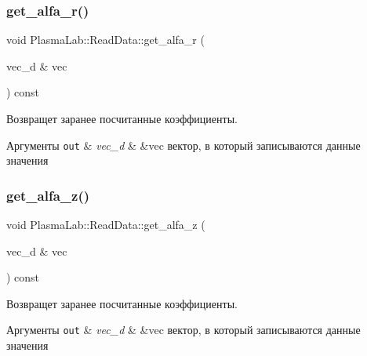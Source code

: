 \subsubsection{\texorpdfstring{get\+\_\+alfa\+\_\+r()}{get\_alfa\_r()}}
{\footnotesize\ttfamily void Plasma\+Lab\+::\+Read\+Data\+::get\+\_\+alfa\+\_\+r (\begin{DoxyParamCaption}\item[{vec\+\_\+d \&}]{vec }\end{DoxyParamCaption}) const\hspace{0.3cm}{\ttfamily [inline]}}

Возвращет заранее посчитанные коэффициенты. 
\begin{DoxyParams}[1]{Аргументы}
\mbox{\tt out}  & {\em vec\+\_\+d} & \&vec вектор, в который записываются данные значения \\
\hline
\end{DoxyParams}
\mbox{\label{class_plasma_lab_1_1_read_data_aba0b62c0133fdbc1d652f3937cc751d5}} 
\subsubsection{\texorpdfstring{get\+\_\+alfa\+\_\+z()}{get\_alfa\_z()}}
{\footnotesize\ttfamily void Plasma\+Lab\+::\+Read\+Data\+::get\+\_\+alfa\+\_\+z (\begin{DoxyParamCaption}\item[{vec\+\_\+d \&}]{vec }\end{DoxyParamCaption}) const\hspace{0.3cm}{\ttfamily [inline]}}

Возвращет заранее посчитанные коэффициенты. 
\begin{DoxyParams}[1]{Аргументы}
\mbox{\tt out}  & {\em vec\+\_\+d} & \&vec вектор, в который записываются данные значения \\
\hline
\end{DoxyParams}
\mbox{\label{class_plasma_lab_1_1_read_data_a14e4218fad93e3b8662b6962c20d501d}} 
